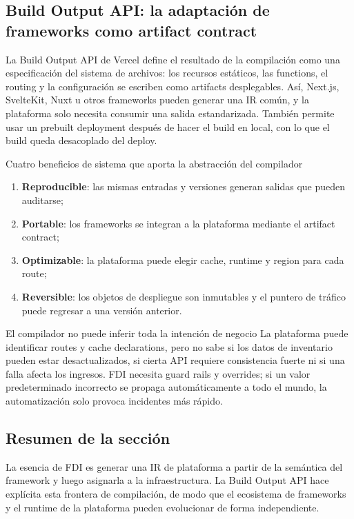 \subsection{Build Output API: la adaptación de frameworks como artifact contract}

La Build Output API de Vercel define el resultado de la compilación como una especificación del sistema de archivos: los recursos estáticos, las functions, el routing y la configuración se escriben como artifacts desplegables. Así, Next.js, SvelteKit, Nuxt u otros frameworks pueden generar una IR común, y la plataforma solo necesita consumir una salida estandarizada. También permite usar un prebuilt deployment después de hacer el build en local, con lo que el build queda desacoplado del deploy.


\begin{importantbox}{Cuatro beneficios de sistema que aporta la abstracción del compilador}
\begin{enumerate}
  \item \textbf{Reproducible}: las mismas entradas y versiones generan salidas que pueden auditarse;
  \item \textbf{Portable}: los frameworks se integran a la plataforma mediante el artifact contract;
  \item \textbf{Optimizable}: la plataforma puede elegir cache, runtime y region para cada route;
  \item \textbf{Reversible}: los objetos de despliegue son inmutables y el puntero de tráfico puede regresar a una versión anterior.
\end{enumerate}
\end{importantbox}

\begin{warningbox}{El compilador no puede inferir toda la intención de negocio}
La plataforma puede identificar routes y cache declarations, pero no sabe si los datos de inventario pueden estar desactualizados, si cierta API requiere consistencia fuerte ni si una falla afecta los ingresos. FDI necesita guard rails y overrides; si un valor predeterminado incorrecto se propaga automáticamente a todo el mundo, la automatización solo provoca incidentes más rápido.
\end{warningbox}

\subsection{Resumen de la sección}

La esencia de FDI es generar una IR de plataforma a partir de la semántica del framework y luego asignarla a la infraestructura. La Build Output API hace explícita esta frontera de compilación, de modo que el ecosistema de frameworks y el runtime de la plataforma pueden evolucionar de forma independiente.
